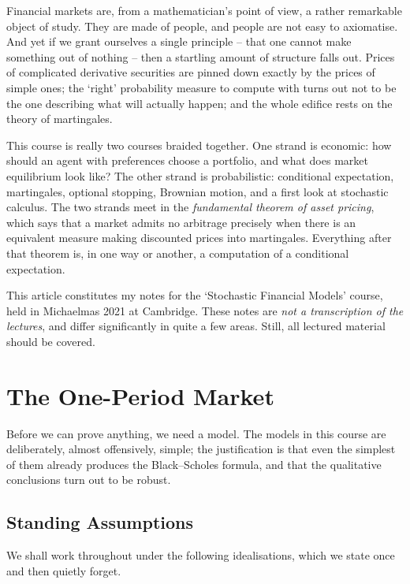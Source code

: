 



Financial markets are, from a mathematician's point of view, a rather remarkable object of study. They are made of people, and people are not easy to axiomatise. And yet if we grant ourselves a single principle -- that one cannot make something out of nothing -- then a startling amount of structure falls out. Prices of complicated derivative securities are pinned down exactly by the prices of simple ones; the `right' probability measure to compute with turns out not to be the one describing what will actually happen; and the whole edifice rests on the theory of martingales.

This course is really two courses braided together. One strand is economic: how should an agent with preferences choose a portfolio, and what does market equilibrium look like? The other strand is probabilistic: conditional expectation, martingales, optional stopping, Brownian motion, and a first look at stochastic calculus. The two strands meet in the \emph{fundamental theorem of asset pricing}, which says that a market admits no arbitrage precisely when there is an equivalent measure making discounted prices into martingales. Everything after that theorem is, in one way or another, a computation of a conditional expectation.

This article constitutes my notes for the `Stochastic Financial Models' course, held in Michaelmas 2021 at Cambridge. These notes are \emph{not a transcription of the lectures}, and differ significantly in quite a few areas. Still, all lectured material should be covered.



\clearpage

\section{The One-Period Market}

Before we can prove anything, we need a model. The models in this course are deliberately, almost offensively, simple; the justification is that even the simplest of them already produces the Black--Scholes formula, and that the qualitative conclusions turn out to be robust.

\subsection{Standing Assumptions}

We shall work throughout under the following idealisations, which we state once and then quietly forget.

